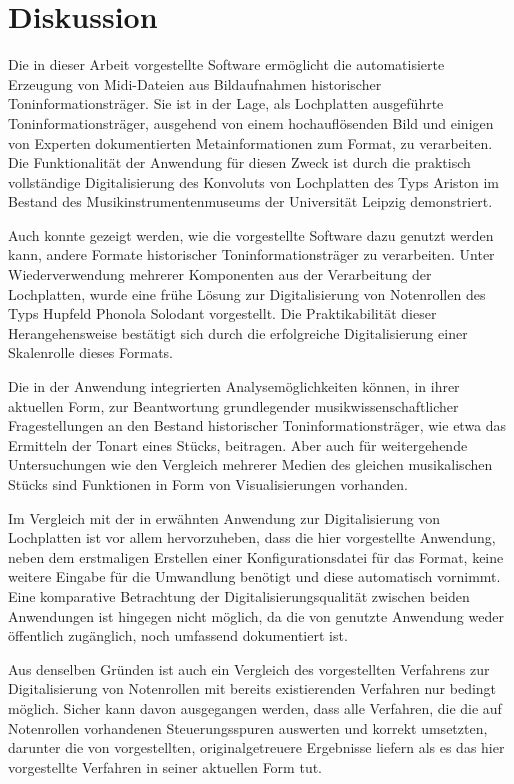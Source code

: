 \section{Diskussion}

Die in dieser Arbeit vorgestellte Software ermöglicht die automatisierte Erzeugung von Midi-Dateien aus Bildaufnahmen historischer Toninformationsträger.
Sie ist in der Lage, als Lochplatten ausgeführte Toninformationsträger, ausgehend von einem hochauflösenden Bild und einigen von Experten dokumentierten Metainformationen zum Format, zu verarbeiten.
Die Funktionalität der Anwendung für diesen Zweck ist durch die praktisch vollständige Digitalisierung des Konvoluts von Lochplatten des Typs Ariston im Bestand des Musikinstrumentenmuseums der Universität Leipzig demonstriert.

Auch konnte gezeigt werden, wie die vorgestellte Software dazu genutzt werden kann, andere Formate historischer Toninformationsträger zu verarbeiten.
Unter Wiederverwendung mehrerer Komponenten aus der Verarbeitung der Lochplatten, wurde eine frühe Lösung zur Digitalisierung von Notenrollen des Typs Hupfeld Phonola Solodant vorgestellt.
Die Praktikabilität dieser Herangehensweise bestätigt sich durch die erfolgreiche Digitalisierung einer Skalenrolle dieses Formats. 

Die in der Anwendung integrierten Analysemöglichkeiten können, in ihrer aktuellen Form, zur Beantwortung grundlegender musikwissenschaftlicher Fragestellungen an den Bestand historischer Toninformationsträger, wie etwa das Ermitteln der Tonart eines Stücks, beitragen.
Aber auch für weitergehende Untersuchungen wie den Vergleich mehrerer Medien des gleichen musikalischen Stücks sind Funktionen in Form von Visualisierungen vorhanden.

Im Vergleich mit der in \textcite[]{perretti_2014} erwähnten Anwendung zur Digitalisierung von Lochplatten ist vor allem hervorzuheben, dass die hier vorgestellte Anwendung, neben dem erstmaligen Erstellen einer Konfigurationsdatei für das Format, keine weitere Eingabe für die Umwandlung benötigt und diese automatisch vornimmt.
Eine komparative Betrachtung der Digitalisierungsqualität zwischen beiden Anwendungen ist hingegen nicht möglich, da die von \textcite[]{perretti_2014} genutzte Anwendung weder öffentlich zugänglich, noch umfassend dokumentiert ist.

Aus denselben Gründen ist auch ein Vergleich des vorgestellten Verfahrens zur Digitalisierung von Notenrollen mit bereits existierenden Verfahren nur bedingt möglich.
Sicher kann davon ausgegangen werden, dass alle Verfahren, die die auf Notenrollen vorhandenen Steuerungsspuren auswerten und korrekt umsetzten, darunter die von \textcite[]{shi_2019, zoltan_1994, colmenares_2011} vorgestellten, originalgetreuere Ergebnisse liefern als es das hier vorgestellte Verfahren in seiner aktuellen Form tut.

